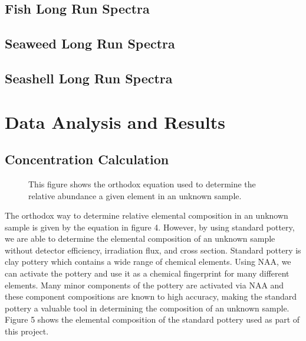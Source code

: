 \documentclass[]{article}
\begin{document}
\subsection{Fish Long Run Spectra}
\subsection{Seaweed Long Run Spectra}
\subsection{Seashell Long Run Spectra}
\pagebreak


\section{Data Analysis and Results}
\subsection{Concentration Calculation}

\begin{figure}[h]
\centering
{}
\caption{This figure shows the orthodox equation used to determine the relative abundance a given element in an unknown sample.}
\end{figure}

The orthodox way to determine relative elemental composition in an unknown sample is given by the equation in figure 4. However, by using standard pottery, we are able to determine the elemental composition of an unknown sample without detector efficiency, irradiation flux, and cross section. Standard pottery is clay pottery which contains a wide range of chemical elements. Using NAA, we can activate the pottery and use it as a chemical fingerprint for many different elements. Many minor components of the pottery are activated via NAA and these component compositions are known to high accuracy, making the standard pottery a valuable tool in determining the composition of an unknown sample. Figure 5 shows the elemental composition of the standard pottery used as part of this project.
\end{document}
